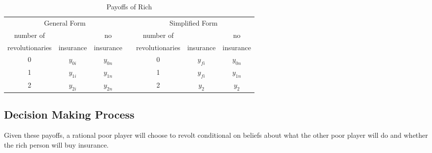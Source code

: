 \documentclass[12pt]{article}
\begin{document}
	\begin{table}[!htbp]
		\caption{Payoffs of Rich}
		\label{rpayoffs}
		\centering
		\begin{tabular}{|c||c|c|c|c||c|c|}
			\multicolumn{3}{c}{General Form} &
			\multicolumn{1}{c}{} &
			\multicolumn{3}{c}{Simplified Form}\\
			\cline{1-3}\cline{5-7}
			number of & & no & & number of & & no\\
			revolutionaries & insurance & insurance && revolutionaries & insurance & insurance\\
			\cline{1-3}\cline{5-7}
			0 & $y_{0i}$ & $y_{0n}$ && 0 & $y_{fi}$ & $y_{0n}$\\
			\cline{1-3}\cline{5-7}
			1 & $y_{1i}$ & $y_{1n}$ && 1 & $y_{fi}$ & $y_{1n}$\\
			\cline{1-3}\cline{5-7}
			2 & $y_{2i}$ & $y_{2n}$ && 2 & $y_2$ & $y_2$\\
			\cline{1-3}\cline{5-7}
		\end{tabular}
	\end{table}
	
	\subsection{Decision Making Process}
	Given these payoffs, a rational poor player will choose to revolt conditional on beliefs about what the other poor player will do and whether the rich person will buy insurance.
	
\end{document}
